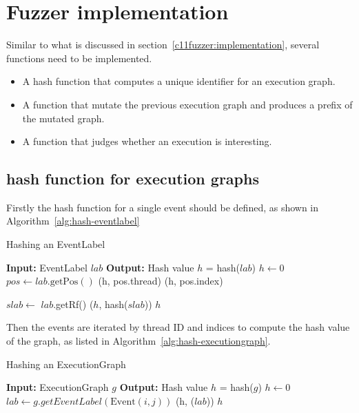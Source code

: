 \section{Fuzzer implementation}

Similar to what is discussed in section~\ref{c11fuzzer:implementation}, several functions need to be implemented.

\begin{itemize}
	\item A hash function that computes a unique identifier for an execution graph.
	\item A function that mutate the previous execution graph and produces a prefix of the mutated graph.
	\item A function that judges whether an execution is interesting.
\end{itemize}


\subsection{hash function for execution graphs}\label{sec:hashf}
Firstly the hash function for a single event should be defined, as shown in Algorithm~\ref{alg:hash-eventlabel}

\begin{algorithm}
	\caption{Hashing an EventLabel}
	\label{alg:hash-eventlabel}
	\begin{algorithmic}[1]
		\STATE \textbf{Input:} EventLabel $lab$
		\STATE \textbf{Output:} Hash value $h$ = hash($lab$)
		\STATE $h \leftarrow 0$
		\STATE $pos \leftarrow lab.\text{getPos}()$
		\STATE {}(h, pos.thread)
		\STATE {}(h, pos.index)

		\STATE $slab \leftarrow$ $lab$.getRf()
		\STATE {}($h$, hash($slab$))
		\ENDIF
		\ENDIF
		\RETURN $h$
	\end{algorithmic}
\end{algorithm}

Then the events are iterated by thread ID and indices to compute the hash value of the graph, as listed in Algorithm~\ref{alg:hash-executiongraph}.


\begin{algorithm}
	\caption{Hashing an ExecutionGraph}
	\label{alg:hash-executiongraph}
	\begin{algorithmic}[1]
		\STATE \textbf{Input:} ExecutionGraph $g$
		\STATE \textbf{Output:} Hash value $h$ = hash($g$)
		\STATE $h \leftarrow 0$
		\STATE $lab \leftarrow g.getEventLabel(\text{Event}(i, j))$
		\STATE {}(h, ($lab$))
		\ENDFOR
		\ENDFOR
		\RETURN $h$
	\end{algorithmic}
\end{algorithm}

